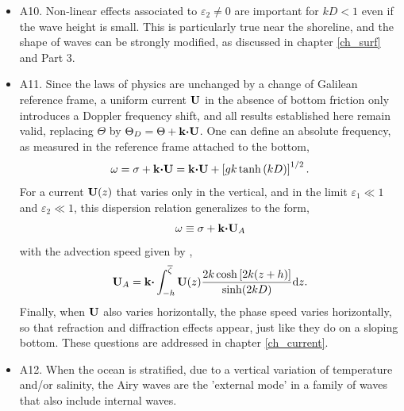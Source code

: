 \begin{itemize}
discussed in chapter \ref{ch_sourceterms} and Part 3. 
One particular consequence is that a monochromatic wave train is generally 
unstable \citep{Benjamin&Feir1967}. For waves in one dimension, as produced in the laboratory, 
this can create very high (freak) waves. Another consequence is that different wave trains interact, 
exchanging energy an momentum.\vspace{0.3cm}
 \item A10. Non-linear effects associated to  $\varepsilon_2 \neq 0$ are important for $kD<1$ even if the wave height is small. 
This is particularly true near the shoreline, and the shape of waves can be strongly modified, as discussed in chapter \ref{ch_surf} and 
Part 3.\vspace{0.3cm}
 \item A11. Since the laws of physics are unchanged by a change of Galilean reference frame, 
a uniform current $\mathbf{U}$ in the absence of bottom friction only introduces a Doppler frequency shift, 
and all results established here remain valid, replacing 
$\Theta$ by $\Theta_D=\Theta+\mathbf{k} \mbox{\boldmath $\cdot$}
 \mathbf{U}$. One can define an absolute frequency, as measured in the reference frame attached to the bottom, 
 \begin{equation}
    \omega=\sigma+\mathbf{k} \mbox{\boldmath $\cdot$} \mathbf{U} =\mathbf{k} \mbox{\boldmath $\cdot$} \mathbf{U} + \left[g k \tanh\left(kD\right)\right]^{1/2}.
     \label{dispersionD}
\end{equation}
For a current   $\mathbf{U}(z)$ that varies only in the vertical, and in the limit  $\varepsilon_1 \ll 1$  and $\varepsilon_2 \ll 1$, 
this dispersion relation generalizes to the form,
 \begin{equation}
    \omega\equiv\sigma+\mathbf{k} \mbox{\boldmath $\cdot$} \mathbf{U}_A      \label{dispersionD2}
\end{equation}
with the advection speed given by \cite{Kirby&Chen1989}, 
 \begin{equation}
 \mathbf{U}_A   = \mathbf{k} \mbox{\boldmath $\cdot$} \int_{-h}^{\overline{\zeta}} \mathbf{U}(z) \frac{2  k
\cosh\left[2k(z+h)\right]}{\sinh(2kD)} \mathrm{d} z. \label{dispersionD3}
\end{equation}
Finally, when $\mathbf{U}$ also varies horizontally, the phase speed varies horizontally, so that refraction and diffraction effects 
appear, just like they do on a sloping bottom. These questions are addressed  in  chapter \ref{ch_current}.\vspace{0.3cm}
\item A12. When the ocean is stratified, due to a vertical variation of temperature and/or salinity, the Airy waves are the 'external mode' in a family of waves that also include internal waves. 

\end{itemize}
